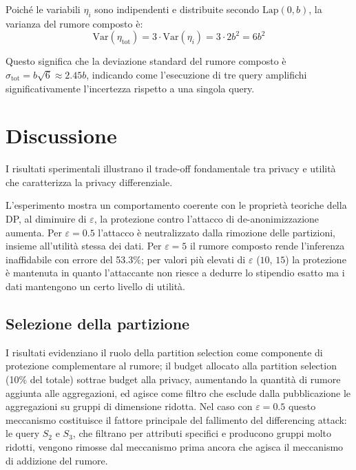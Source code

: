 Poiché le variabili $\eta_i$ sono indipendenti e distribuite secondo $\text{Lap}(0, b)$, la varianza del rumore composto è:
\begin{equation}
    \text{Var}(\eta_{\text{tot}}) = 3 \cdot \text{Var}(\eta_i) = 3 \cdot 2b^2 = 6b^2
    \label{eq:noise_variance}
\end{equation}

Questo significa che la deviazione standard del rumore composto è $\sigma_{\text{tot}} = b\sqrt{6} \approx 2.45b$, indicando come l'esecuzione di tre query amplifichi significativamente l'incertezza rispetto a una singola query.

\section{Discussione}

I risultati sperimentali illustrano il trade-off fondamentale tra privacy e utilità che caratterizza la privacy differenziale.

L'esperimento mostra un comportamento coerente con le proprietà teoriche della DP, al diminuire di $\varepsilon$, la protezione contro l'attacco di de-anonimizzazione aumenta. Per $\varepsilon = 0.5$ l'attacco è neutralizzato dalla rimozione delle partizioni, insieme all'utilità stessa dei dati. Per $\varepsilon = 5$ il rumore composto rende l'inferenza inaffidabile con errore del 53.3\%; per valori più elevati di $\varepsilon$ ($10$, $15$) la protezione è mantenuta in quanto l'attaccante non riesce a dedurre lo stipendio esatto ma i dati mantengono un certo livello di utilità.

\subsection{Selezione della partizione}

I risultati evidenziano il ruolo della partition selection come componente di protezione complementare al rumore; il budget allocato alla partition selection (10\% del totale) sottrae budget alla privacy, aumentando la quantità di rumore aggiunta alle aggregazioni, ed agisce come filtro che esclude dalla pubblicazione le aggregazioni su gruppi di dimensione ridotta. Nel caso con $\varepsilon = 0.5$ questo meccanismo costituisce il fattore principale del fallimento del differencing attack: le query $S_2$ e $S_3$, che filtrano per attributi specifici e producono gruppi molto ridotti, vengono rimosse dal meccanismo prima ancora che agisca il meccanismo di addizione del rumore.

